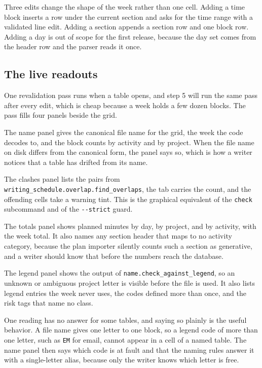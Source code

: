 \documentclass[11pt]{article}
\begin{document}
Three edits change the shape of the week rather than one cell. Adding a time
block inserts a row under the current section and asks for the time range with
a validated line edit. Adding a section appends a section row and one block
row. Adding a day is out of scope for the first release, because the day set
comes from the header row and the parser reads it once.
\subsection{The live readouts}
\label{sec:org89b147a}

One revalidation pass runs when a table opens, and step 5 will run the same pass
after every edit, which is cheap because a week holds a few dozen blocks. The
pass fills four panels beside the grid.

The name panel gives the canonical file name for the grid, the week the code
decodes to, and the block counts by activity and by project. When the file name
on disk differs from the canonical form, the panel says so, which is how a
writer notices that a table has drifted from its name.

The clashes panel lists the pairs from \texttt{writing\_schedule.overlap.find\_overlaps},
the tab carries the count, and the offending cells take a warning tint. This is
the graphical equivalent of the \texttt{check} subcommand and of the \texttt{-{}-{}strict} guard.

The totals panel shows planned minutes by day, by project, and by activity, with
the week total. It also names any section header that maps to no activity
category, because the plan importer silently counts such a section as
generative, and a writer should know that before the numbers reach the database.

The legend panel shows the output of \texttt{name.check\_against\_legend}, so an unknown
or ambiguous project letter is visible before the file is used. It also lists
legend entries the week never uses, the codes defined more than once, and the
risk tags that name no class.

One reading has no answer for some tables, and saying so plainly is the useful
behavior. A file name gives one letter to one block, so a legend code of more
than one letter, such as \texttt{EM} for email, cannot appear in a cell of a named
table. The name panel then says which code is at fault and that the naming rules
answer it with a single-letter alias, because only the writer knows which letter
is free.
\end{document}
